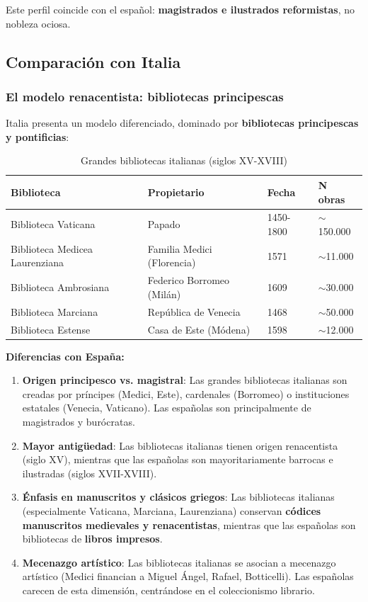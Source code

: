 \documentclass[11pt,a4paper]{article}
\begin{document}
Este perfil coincide con el español: \textbf{magistrados e ilustrados reformistas}, no nobleza ociosa.

\subsection{Comparación con Italia}

\subsubsection{El modelo renacentista: bibliotecas principescas}

Italia presenta un modelo diferenciado, dominado por \textbf{bibliotecas principescas y pontificias}:

\begin{table}[h]
\centering
\begin{tabular}{llll}
\toprule
\textbf{Biblioteca} & \textbf{Propietario} & \textbf{Fecha} & \textbf{N obras} \\
\midrule
Biblioteca Vaticana & Papado & 1450-1800 & $\sim$150.000 \\
Biblioteca Medicea Laurenziana & Familia Medici (Florencia) & 1571 & $\sim$11.000 \\
Biblioteca Ambrosiana & Federico Borromeo (Milán) & 1609 & $\sim$30.000 \\
Biblioteca Marciana & República de Venecia & 1468 & $\sim$50.000 \\
Biblioteca Estense & Casa de Este (Módena) & 1598 & $\sim$12.000 \\
\bottomrule
\end{tabular}
\caption{Grandes bibliotecas italianas (siglos XV-XVIII)}
\end{table}

\textbf{Diferencias con España:}

\begin{enumerate}
\item \textbf{Origen principesco vs. magistral}: Las grandes bibliotecas italianas son creadas por príncipes (Medici, Este), cardenales (Borromeo) o instituciones estatales (Venecia, Vaticano). Las españolas son principalmente de magistrados y burócratas.

\item \textbf{Mayor antigüedad}: Las bibliotecas italianas tienen origen renacentista (siglo XV), mientras que las españolas son mayoritariamente barrocas e ilustradas (siglos XVII-XVIII).

\item \textbf{Énfasis en manuscritos y clásicos griegos}: Las bibliotecas italianas (especialmente Vaticana, Marciana, Laurenziana) conservan \textbf{códices manuscritos medievales y renacentistas}, mientras que las españolas son bibliotecas de \textbf{libros impresos}.

\item \textbf{Mecenazgo artístico}: Las bibliotecas italianas se asocian a mecenazgo artístico (Medici financian a Miguel Ángel, Rafael, Botticelli). Las españolas carecen de esta dimensión, centrándose en el coleccionismo librario.
\end{enumerate}
\end{document}
